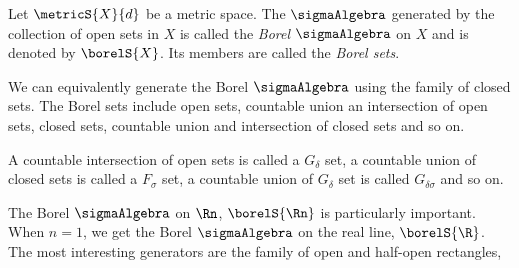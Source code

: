 \begin{Definition}[name=Borel Sets]
    Let $\metricS{X}{d}$ be a metric space. The $\sigmaAlgebra$ generated by the collection of open
    sets in $X$ is called the \emph{Borel} $\sigmaAlgebra$ on $X$ and is denoted by $\borelS{X}$.
    Its members are called the \emph{Borel sets}.
\end{Definition}
We can equivalently generate the Borel $\sigmaAlgebra$ using the family of closed sets. The Borel
sets include open sets, countable union an intersection of open sets, closed sets, countable union
and intersection of closed sets and so on. 
\begin{Definition}
    A countable intersection of open sets is called a $G_{\delta}$ set, a countable union of closed
    sets is called a $F_{\sigma}$ set, a countable union of $G_{\delta}$ set is called
    $G_{\delta\sigma}$ and so on.
\end{Definition}
The Borel $\sigmaAlgebra$ on $\Rn$, $\borelS{\Rn}$ is particularly important. When $n = 1$, we get
the Borel $\sigmaAlgebra$ on the real line, $\borelS{\R}$. The most interesting generators are the
family of open and half-open rectangles,


